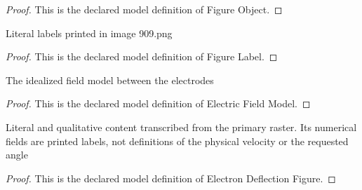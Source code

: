 \begin{proof}
  This is the declared model definition of Figure Object.
\end{proof}
\begin{definition}
  \label{def:physics:phyx-mini-0909:phyxminiproblems-problemphyxmini0909-figurelabel}
  Literal labels printed in image 909.png
\end{definition}
\begin{proof}
  This is the declared model definition of Figure Label.
\end{proof}
\begin{definition}
  \label{def:physics:phyx-mini-0909:phyxminiproblems-problemphyxmini0909-electricfieldmodel}
  The idealized field model between the electrodes
\end{definition}
\begin{proof}
  This is the declared model definition of Electric Field Model.
\end{proof}
\begin{definition}
  \label{def:physics:phyx-mini-0909:phyxminiproblems-problemphyxmini0909-electrondeflectionfigure}
  Literal and qualitative content transcribed from the primary raster. Its numerical fields are printed labels, not definitions of the physical velocity or the requested angle
\end{definition}
\begin{proof}
  This is the declared model definition of Electron Deflection Figure.
\end{proof}
